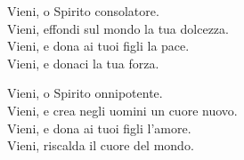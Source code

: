 

\spazio

\strofa Vieni, o Spirito consolatore.\\
Vieni, effondi sul mondo la tua dolcezza.\\
Vieni, e dona ai tuoi figli la pace.\\
Vieni, e donaci la tua forza.

\spazio


\spazio

\strofa Vieni, o Spirito onnipotente.\\
Vieni, e crea negli uomini un cuore nuovo.\\
Vieni, e dona ai tuoi figli l'amore.\\
Vieni, riscalda il cuore del mondo.

\spazio


